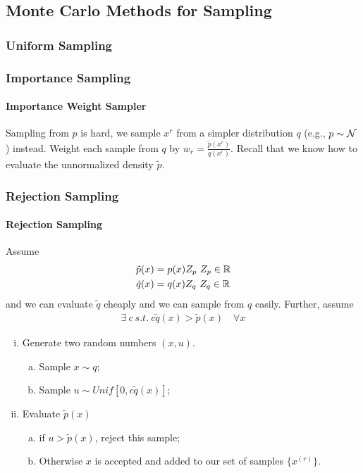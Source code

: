 \documentclass{article}
\begin{document}
	\subsection{Monte Carlo Methods for Sampling}
	\subsubsection{Uniform Sampling}
	\subsubsection{Importance Sampling}
	\paragraph{Importance Weight Sampler} Sampling from $p$ is hard, we sample $x^r$ from a simpler distribution $q$ (e.g., $p \sim \mathcal{{N}}$) instead. Weight each sample from $q$ by $w_r = \frac{\tilde{p}(x^r)}{q(x^r)}$. Recall that we know how to evaluate the unnormalized density $\tilde{p}$.
	\subsubsection{Rejection Sampling}
	\paragraph{Rejection Sampling} Assume
	\begin{align}
		\tilde{p}(x) &= p(x) Z_p\ Z_p \in \mathbb{R} \\
		\tilde{q}(x) &= q(x) Z_q\ Z_q \in \mathbb{R}
	\end{align}
	and we can evaluate $\tilde{q}$ cheaply and we can sample from $q$ easily. Further, assume
	\begin{align}
		\exists\ c\ s.t.\ c \tilde{q}(x) > \tilde{p}(x)\quad \forall x
	\end{align}
	\begin{algorithm} \quad
		\begin{enumerate}[(i)]
			\item Generate two random numbers $(x, u)$.
			\begin{enumerate}[(a)]
				\item Sample $x \sim q$;
				\item Sample $u \sim Unif[0, c \tilde{q}(x)]$;
			\end{enumerate}
			\item Evaluate $\tilde{p}(x)$
			\begin{enumerate}[(a)]
				\item if $u > \tilde{p}(x)$, reject this sample;
				\item Otherwise $x$ is accepted and added to our set of samples $\lbrace x^{(r)} \rbrace$.
			\end{enumerate}
		\end{enumerate}
	\end{algorithm}
	
\end{document}
